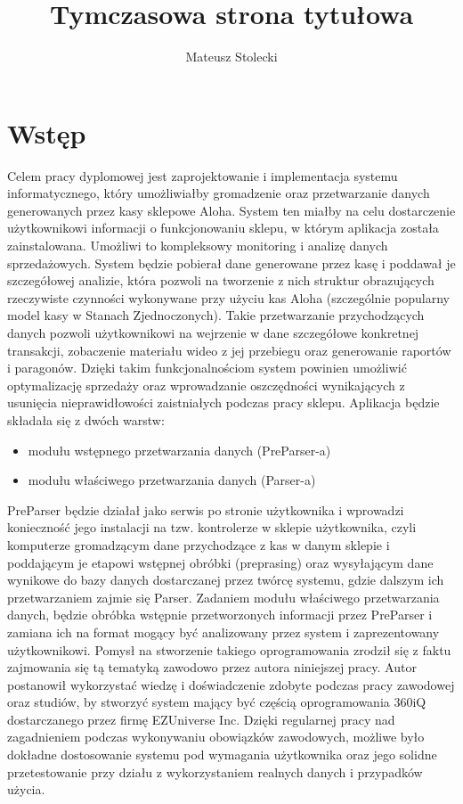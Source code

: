 \documentclass[a4paper]{book}
\title{Tymczasowa strona tytułowa}
\author{Mateusz Stolecki}
\begin{document}

\cleardoublepage

	



\mainmatter

\chapter{Wstęp}
Celem pracy dyplomowej jest zaprojektowanie i implementacja systemu informatycznego, który umożliwiałby gromadzenie oraz przetwarzanie danych generowanych przez kasy sklepowe Aloha. System ten miałby na  celu dostarczenie użytkownikowi informacji o funkcjonowaniu sklepu, w którym aplikacja została zainstalowana. Umożliwi to kompleksowy monitoring i analizę danych sprzedażowych. System będzie pobierał dane generowane przez kasę i poddawał je szczegółowej analizie, która pozwoli na tworzenie z nich struktur  obrazujących rzeczywiste czynności wykonywane przy użyciu kas Aloha (szczególnie popularny model kasy w Stanach Zjednoczonych). Takie przetwarzanie przychodzących danych pozwoli użytkownikowi na wejrzenie w dane szczegółowe konkretnej transakcji, zobaczenie materiału wideo z jej przebiegu oraz generowanie raportów i paragonów. Dzięki takim funkcjonalnościom system powinien umożliwić optymalizację sprzedaży oraz wprowadzanie oszczędności wynikających z usunięcia nieprawidłowości zaistniałych podczas pracy sklepu. Aplikacja będzie składała się z dwóch warstw:
\begin{itemize}
	\item modułu wstępnego przetwarzania danych (PreParser-a)
	\item modułu właściwego przetwarzania danych (Parser-a)
\end{itemize}
PreParser będzie działał jako serwis po stronie użytkownika i wprowadzi konieczność jego instalacji na tzw. kontrolerze w sklepie użytkownika, czyli komputerze gromadzącym dane przychodzące z kas w danym sklepie i poddającym je etapowi wstępnej obróbki (preprasing) oraz wysyłającym dane wynikowe do bazy danych dostarczanej przez twórcę systemu, gdzie dalszym ich przetwarzaniem zajmie się Parser. Zadaniem modułu właściwego przetwarzania danych, będzie obróbka wstępnie przetworzonych informacji przez PreParser i zamiana ich na format mogący być analizowany przez system i zaprezentowany użytkownikowi. Pomysł na stworzenie takiego oprogramowania zrodził się z faktu zajmowania się tą tematyką zawodowo przez autora niniejszej pracy. Autor postanowił wykorzystać wiedzę i doświadczenie zdobyte podczas pracy zawodowej oraz studiów, by stworzyć system mający być częścią oprogramowania 360iQ dostarczanego przez firmę EZUniverse Inc. Dzięki regularnej pracy nad zagadnieniem podczas wykonywaniu obowiązków zawodowych, możliwe było dokładne dostosowanie systemu pod wymagania użytkownika oraz jego solidne przetestowanie przy działu z wykorzystaniem realnych danych i przypadków użycia.
\end{document}
